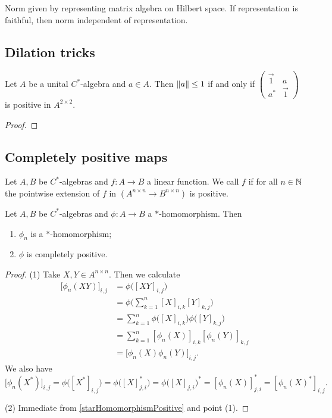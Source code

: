 \begin{proposition}
Norm given by representing matrix algebra on Hilbert space. If representation is faithful, then norm independent of representation.
\end{proposition}

\subsection{Dilation tricks}
\begin{lemma}
Let $A$ be a unital $C^*$-algebra and $a\in A$. Then $\lVert a\rVert\leq 1$ \textup{if and only if} $\begin{pmatrix}
\vec{1} & a \\ a^* & \vec{1}
\end{pmatrix}$ is positive in $A^{2\times 2}$.
\end{lemma}
\begin{proof}

\end{proof}

\subsection{Completely positive maps}
\begin{definition}
Let $A,B$ be $C^*$-algebras and $f:A\to B$ a linear function. We call $f$  if for all $n\in\mathbb{N}$ the pointwise extension of $f$ in $(A^{n\times n}\to B^{n\times n})$ is positive.
\end{definition}

\begin{lemma}
Let $A,B$ be $C^*$-algebras and $\phi:A\to B$ a $*$-homomorphism. Then
\begin{enumerate}
\item $\phi_n$ is a $*$-homomorphism;
\item $\phi$ is completely positive.
\end{enumerate}
\end{lemma}
\begin{proof}
(1) Take $X,Y\in A^{n\times n}$. Then we calculate
\begin{align*}
\big[\phi_n(XY)\big]_{i,j} &= \phi\big([XY]_{i,j}\big) \\
&= \phi\Big(\sum_{k=1}^n[X]_{i,k}[Y]_{k,j}\Big) \\
&= \sum_{k=1}^n\phi\big([X]_{i,k}\big)\phi\big([Y]_{k,j}\big) \\
&= \sum_{k=1}^n[\phi_n(X)]_{i,k}[\phi_n(Y)]_{k,j} \\
&= \big[\phi_n(X)\phi_n(Y)\big]_{i,j}.
\end{align*}
We also have
\[ \big[\phi_n(X^*)\big]_{i,j} = \phi\big([X^*]_{i,j}\big) = \phi\big([X]_{j,i}^*\big) = \phi\big([X]_{j,i}\big)^* = [\phi_n(X)]_{j,i}^* = [\phi_n(X)^*]_{i,j}. \]

(2) Immediate from \ref{starHomomorphismPositive} and point (1).
\end{proof}

